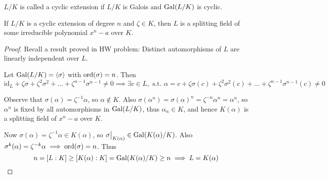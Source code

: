 \begin{definition}
  $L/K$ is called a cyclic extension if $L/K$ is Galois and $\operatorname{Gal}(L/K)$ is cyclic.
\end{definition}

\begin{theorem} \label{thm:kummer-base-theorem}
  If $L/K$ is a cyclic extension of degree $n$ and $\zeta \in K$, then $L$ is a splitting field of
  some irreducible polynomial $x^n - a$ over $K$.

  \begin{proof}
    Recall a result proved in HW problem: Distinct automorphisms of $L$ are linearly independent over $L$.
    
    Let $\operatorname{Gal}(L/K) = \langle \sigma \rangle$ with $\operatorname{ord}(\sigma) = n$. Then
    \[ \text{id}_L + \zeta \sigma + \zeta^2 \sigma^2 + \dots + \zeta^{n-1} \sigma^{n-1} \neq 0
      \implies \exists c \in L, \text{ s.t. } \alpha = c + \zeta \sigma(c) + \zeta^2 \sigma^2(c)
      + \dots + \zeta^{n-1} \sigma^{n-1}(c) \neq 0 \]

    Observe that $\sigma(\alpha) = \zeta^{-1} \alpha$, so $\alpha \not\in K$. Also $\sigma(\alpha^n)
    = \sigma(\alpha)^n = \zeta^{-n}\alpha^n = \alpha^n$, so $\alpha^n$ is fixed by all automorphisms
    in $\operatorname{Gal}(L/K)$, thus $\alpha_n \in K$, and hence $K(\alpha)$ is a splitting field of $x^n - a$ over $K$.

    Now $\sigma(\alpha) = \zeta^{-1}\alpha \in K(\alpha)$, so $\sigma\big|_{K(\alpha)} \in \operatorname{Gal}(K(\alpha) / K)$.
    Also $\sigma^k(\alpha) = \zeta^{-k} \alpha \implies \operatorname{ord}(\sigma) = n$.
    Thus
    \[
      n = [L: K] \geq [K(\alpha): K] = \operatorname{Gal}(K(\alpha) / K) \geq n \implies L = K(\alpha)
      \qedhere
    \]
  \end{proof}
\end{theorem}

